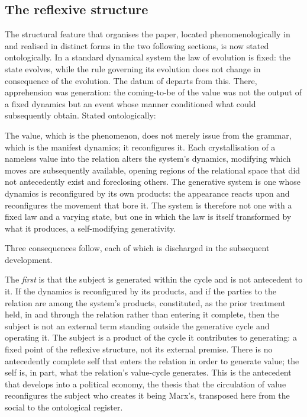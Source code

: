 \subsection{The reflexive structure}
\label{p10:sec:reflexive}

The structural feature that organises the paper, located phenomenologically in  and realised in distinct forms in the two following sections, is now stated ontologically. In a standard dynamical system the law of evolution is fixed: the state evolves, while the rule governing its evolution does not change in consequence of the evolution. The datum of  departs from this. There, apprehension was generation: the coming-to-be of the value was not the output of a fixed dynamics but an event whose manner conditioned what could subsequently obtain. Stated ontologically:

\begin{claim}
The value, which is the phenomenon, does not merely issue from the grammar, which is the manifest dynamics; it reconfigures it. Each crystallisation of a nameless value into the relation alters the system's dynamics, modifying which moves are subsequently available, opening regions of the relational space that did not antecedently exist and foreclosing others. The generative system is one whose dynamics is reconfigured by its own products: the appearance reacts upon and reconfigures the movement that bore it. The system is therefore not one with a fixed law and a varying state, but one in which the law is itself transformed by what it produces, a self-modifying generativity.
\end{claim}

\noindent
Three consequences follow, each of which is discharged in the subsequent development.

The \emph{first} is that the subject is generated within the cycle and is not antecedent to it. If the dynamics is reconfigured by its products, and if the parties to the relation are among the system's products, constituted, as the prior treatment held, in and through the relation rather than entering it complete, then the subject is not an external term standing outside the generative cycle and operating it. The subject is a product of the cycle it contributes to generating: a fixed point of the reflexive structure, not its external premise. There is no antecedently complete self that enters the relation in order to generate value; the self is, in part, what the relation's value-cycle generates. This is the antecedent that  develops into a political economy, the thesis that the circulation of value reconfigures the subject who creates it being Marx's, transposed here from the social to the ontological register.

